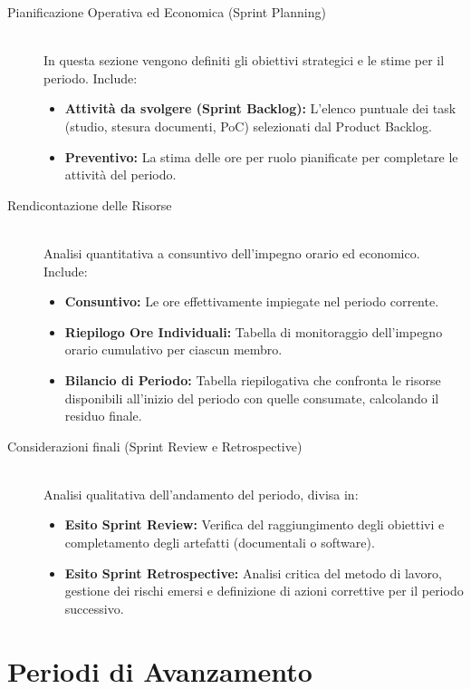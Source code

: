 \documentclass[a4paper, 11pt, oneside]{scrartcl} %
\begin{document}
\begin{description}
    \item[Pianificazione Operativa ed Economica (Sprint Planning)] \hfill \\
    In questa sezione vengono definiti gli obiettivi strategici e le stime per il periodo. Include:
    \begin{itemize}
        \item \textbf{Attività da svolgere (Sprint Backlog):} L'elenco puntuale dei task (studio, stesura documenti, PoC) selezionati dal Product Backlog.
        \item \textbf{Preventivo:} La stima delle ore per ruolo pianificate per completare le attività del periodo.
    \end{itemize}

    \item[Rendicontazione delle Risorse] \hfill \\
    Analisi quantitativa a consuntivo dell'impegno orario ed economico. Include:
    \begin{itemize}
        \item \textbf{Consuntivo:} Le ore effettivamente impiegate nel periodo corrente.
        \item \textbf{Riepilogo Ore Individuali:} Tabella di monitoraggio dell'impegno orario cumulativo per ciascun membro.
        \item \textbf{Bilancio di Periodo:} Tabella riepilogativa che confronta le risorse disponibili all'inizio del periodo con quelle consumate, calcolando il residuo finale.
    \end{itemize}

    \item[Considerazioni finali (Sprint Review e Retrospective)] \hfill \\
    Analisi qualitativa dell'andamento del periodo, divisa in:
    \begin{itemize}
        \item \textbf{Esito Sprint Review:} Verifica del raggiungimento degli obiettivi e completamento degli artefatti (documentali o software).
        \item \textbf{Esito Sprint Retrospective:} Analisi critica del metodo di lavoro, gestione dei rischi emersi e definizione di azioni correttive per il periodo successivo.
    \end{itemize}
\end{description}
\newpage


\section{Periodi di Avanzamento}
\end{document}
